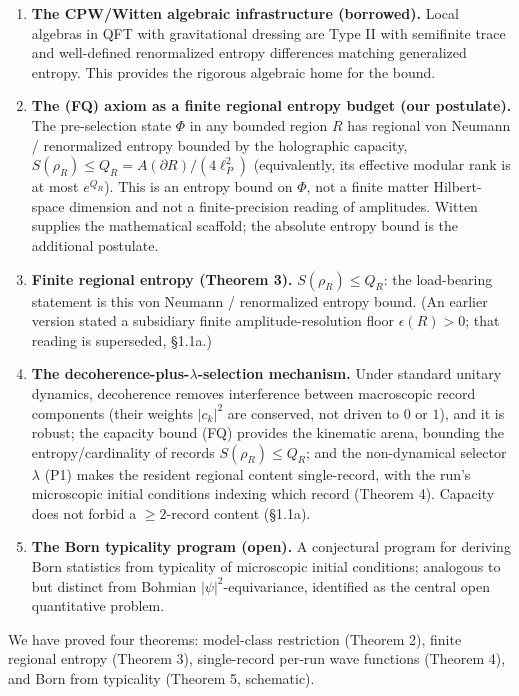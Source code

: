 \documentclass[11pt,a4paper]{article}
\begin{document}
\begin{enumerate}
  \item \textbf{The CPW/Witten algebraic infrastructure (borrowed).} Local algebras in QFT with gravitational dressing are Type II with semifinite trace and well-defined renormalized entropy differences matching generalized entropy. This provides the rigorous algebraic home for the bound.
  \item \textbf{The (FQ) axiom as a finite regional entropy budget (our postulate).} The pre-selection state $\Phi$ in any bounded region $R$ has regional von Neumann / renormalized entropy bounded by the holographic capacity, $S(\rho_R) \le Q_R = A(\partial R)/(4\ell_P^2)$ (equivalently, its effective modular rank is at most $e^{Q_R}$). This is an entropy bound on $\Phi$, not a finite matter Hilbert-space dimension and not a finite-precision reading of amplitudes. Witten supplies the mathematical scaffold; the absolute entropy bound is the additional postulate.
  \item \textbf{Finite regional entropy (Theorem 3).} $S(\rho_R) \le Q_R$: the load-bearing statement is this von Neumann / renormalized entropy bound. (An earlier version stated a subsidiary finite amplitude-resolution floor $\epsilon(R) > 0$; that reading is superseded, §1.1a.)
  \item \textbf{The decoherence-plus-$\lambda$-selection mechanism.} Under standard unitary dynamics, decoherence removes interference between macroscopic record components (their weights $|c_k|^2$ are conserved, not driven to $0$ or $1$), and it is robust; the capacity bound (FQ) provides the kinematic arena, bounding the entropy/cardinality of records $S(\rho_R) \le Q_R$; and the non-dynamical selector $\lambda$ (P1) makes the resident regional content single-record, with the run's microscopic initial conditions indexing which record (Theorem 4). Capacity does not forbid a $\ge 2$-record content (§1.1a).
  \item \textbf{The Born typicality program (open).} A conjectural program for deriving Born statistics from typicality of microscopic initial conditions; analogous to but distinct from Bohmian $|\psi|^2$-equivariance, identified as the central open quantitative problem.
\end{enumerate}

We have proved four theorems: model-class restriction (Theorem 2), finite regional entropy (Theorem 3), single-record per-run wave functions (Theorem 4), and Born from typicality (Theorem 5, schematic).
\end{document}
